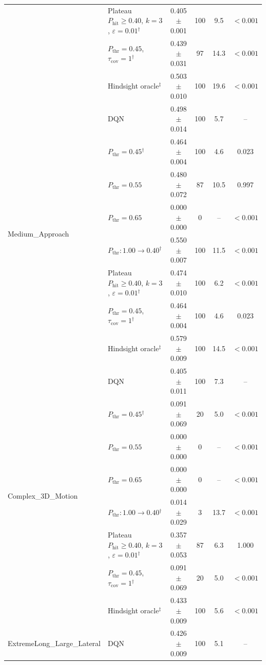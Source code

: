 \begin{table}[htbp]
\begin{tabular}{llcccc}
 & Plateau $P_{\mathrm{hit}}\geq0.40$, $k=3$, $\varepsilon=0.01$$^{\dagger}$ & 0.405 $\pm$ 0.001 & 100 & 9.5 & $<0.001$ \\
 & $P_{\mathrm{thr}}=0.45$, $\tau_{\mathrm{cov}}=1$$^{\dagger}$ & 0.439 $\pm$ 0.031 & 97 & 14.3 & $<0.001$ \\
 & Hindsight oracle$^{\ddagger}$ & 0.503 $\pm$ 0.010 & 100 & 19.6 & $<0.001$ \\
\midrule
\multirow{8}{*}{Medium\_Approach} & DQN & 0.498 $\pm$ 0.014 & 100 & 5.7 & -- \\
 & $P_{\mathrm{thr}}=0.45$$^{\dagger}$ & 0.464 $\pm$ 0.004 & 100 & 4.6 & 0.023 \\
 & $P_{\mathrm{thr}}=0.55$ & 0.480 $\pm$ 0.072 & 87 & 10.5 & 0.997 \\
 & $P_{\mathrm{thr}}=0.65$ & 0.000 $\pm$ 0.000 & 0 & -- & $<0.001$ \\
 & $P_{\mathrm{thr}}: 1.00 \to 0.40$$^{\dagger}$ & 0.550 $\pm$ 0.007 & 100 & 11.5 & $<0.001$ \\
 & Plateau $P_{\mathrm{hit}}\geq0.40$, $k=3$, $\varepsilon=0.01$$^{\dagger}$ & 0.474 $\pm$ 0.010 & 100 & 6.2 & $<0.001$ \\
 & $P_{\mathrm{thr}}=0.45$, $\tau_{\mathrm{cov}}=1$$^{\dagger}$ & 0.464 $\pm$ 0.004 & 100 & 4.6 & 0.023 \\
 & Hindsight oracle$^{\ddagger}$ & 0.579 $\pm$ 0.009 & 100 & 14.5 & $<0.001$ \\
\midrule
\multirow{8}{*}{Complex\_3D\_Motion} & DQN & 0.405 $\pm$ 0.011 & 100 & 7.3 & -- \\
 & $P_{\mathrm{thr}}=0.45$$^{\dagger}$ & 0.091 $\pm$ 0.069 & 20 & 5.0 & $<0.001$ \\
 & $P_{\mathrm{thr}}=0.55$ & 0.000 $\pm$ 0.000 & 0 & -- & $<0.001$ \\
 & $P_{\mathrm{thr}}=0.65$ & 0.000 $\pm$ 0.000 & 0 & -- & $<0.001$ \\
 & $P_{\mathrm{thr}}: 1.00 \to 0.40$$^{\dagger}$ & 0.014 $\pm$ 0.029 & 3 & 13.7 & $<0.001$ \\
 & Plateau $P_{\mathrm{hit}}\geq0.40$, $k=3$, $\varepsilon=0.01$$^{\dagger}$ & 0.357 $\pm$ 0.053 & 87 & 6.3 & 1.000 \\
 & $P_{\mathrm{thr}}=0.45$, $\tau_{\mathrm{cov}}=1$$^{\dagger}$ & 0.091 $\pm$ 0.069 & 20 & 5.0 & $<0.001$ \\
 & Hindsight oracle$^{\ddagger}$ & 0.433 $\pm$ 0.009 & 100 & 5.6 & $<0.001$ \\
\midrule
\multirow{8}{*}{ExtremeLong\_Large\_Lateral} & DQN & 0.426 $\pm$ 0.009 & 100 & 5.1 & -- \\

\end{tabular}
\end{table}

